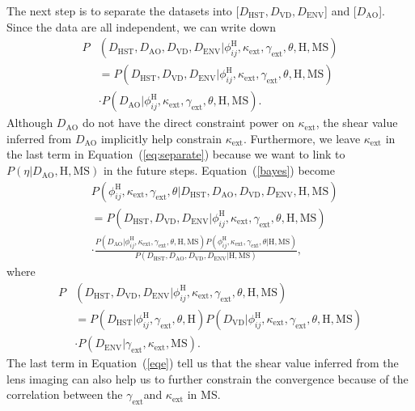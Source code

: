 \documentclass[useAMS,usenatbib]{mnras}
\newcommand{\eref}[1]{Equation~(\ref{#1})}
\begin{document}
The next step is to separate the datasets into [$D_{\textrm{HST}},D_{\textrm{VD}}, D_{\textrm{ENV}}$] and [$D_{\textrm{AO}}$]. Since the data are all independent, we can write down
\begin{equation}
\label{eq:separate}
    \begin{split}
        P&(D_{\textrm{HST}},D_{\textrm{AO}},D_{\textrm{VD}}, D_{\textrm{ENV}}|\phi_{ij}^{\textrm{H}},\kappa_{\textrm{ext}},\gamma_{\textrm{ext}},\theta,\textrm{H},\textrm{MS})\\
        &=P(D_{\textrm{HST}},D_{\textrm{VD}}, D_{\textrm{ENV}}|\phi_{ij}^{\textrm{H}},\kappa_{\textrm{ext}},\gamma_{\textrm{ext}},\theta,\textrm{H},\textrm{MS})\\
        &\cdot P(D_{\textrm{AO}}|\phi_{ij}^{\textrm{H}},\kappa_{\textrm{ext}},\gamma_{\textrm{ext}},\theta,\textrm{H},\textrm{MS}).
    \end{split}
\end{equation}
Although $D_{\textrm{AO}}$ do not have the direct constraint power on $\kappa_{\textrm{ext}}$, the shear value inferred from $D_{\textrm{AO}}$ implicitly help constrain $\kappa_{\textrm{ext}}$. Furthermore, we leave $\kappa_{\textrm{ext}}$ in the last term in \eref{eq:separate} because we want to link to $P(\eta|D_{\textrm{AO}},\textrm{H},\textrm{MS})$ in the future steps. 
\eref{bayes} become
\begin{equation}
\label{inde}
\begin{split}
    &P(\phi_{ij}^{\textrm{H}},\kappa_{\textrm{ext}},\gamma_{\textrm{ext}},\theta|D_{\textrm{HST}},D_{\textrm{AO}},D_{\textrm{VD}}, D_{\textrm{ENV}},\textrm{H},\textrm{MS})\\
   &=P(D_{\textrm{HST}},D_{\textrm{VD}}, D_{\textrm{ENV}}|\phi_{ij}^{\textrm{H}},\kappa_{\textrm{ext}},\gamma_{\textrm{ext}},\theta,\textrm{H},\textrm{MS})\\ &\cdot\frac{P(D_{\textrm{AO}}|\phi_{ij}^{\textrm{H}},\kappa_{\textrm{ext}},\gamma_{\textrm{ext}},\theta,\textrm{H},\textrm{MS})P(\phi_{ij}^{\textrm{H}},\kappa_{\textrm{ext}},\gamma_{\textrm{ext}},\theta|\textrm{H},\textrm{MS})}{P(D_{\textrm{HST}},D_{\textrm{AO}},D_{\textrm{VD}}, D_{\textrm{ENV}}|\textrm{H},\textrm{MS})},
\end{split}
\end{equation}
where
\begin{equation}
\label{eqe}
\begin{split}
    P&(D_{\textrm{HST}},D_{\textrm{VD}}, D_{\textrm{ENV}}|\phi_{ij}^{\textrm{H}},\kappa_{\textrm{ext}},\gamma_{\textrm{ext}},\theta,\textrm{H},\textrm{MS})\\
    &=P(D_{\textrm{HST}}|\phi_{ij}^{\textrm{H}},\gamma_{\textrm{ext}},\theta,\textrm{H})P(D_{\textrm{VD}}|\phi_{ij}^{\textrm{H}},\kappa_{\textrm{ext}},\gamma_{\textrm{ext}},\theta,\textrm{H},\textrm{MS})\\
    &\cdot P(D_{\textrm{ENV}}|\gamma_{\textrm{ext}},\kappa_{\textrm{ext}},\textrm{MS}).
\end{split}
\end{equation}
The last term in \eref{eqe} tell us that the shear value inferred from the lens imaging can also help us to further constrain the convergence because of the correlation between the $\gamma_{\textrm{ext}}$and $\kappa_{\textrm{ext}}$ in MS.
\end{document}
